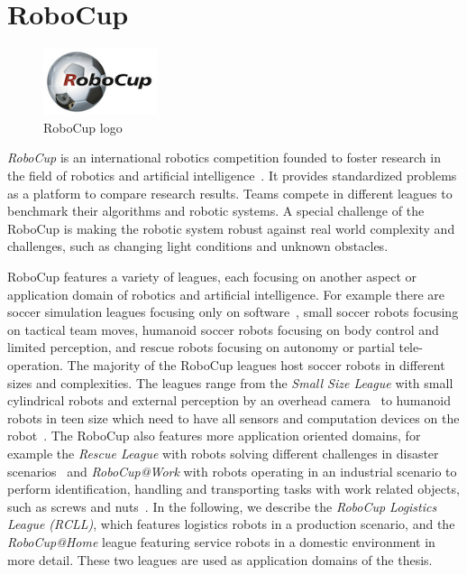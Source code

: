 \section{RoboCup}
\label{sec:robocup}
\begin{figure}
  \centering
  \vspace{-2.7ex}
  \includegraphics[width=0.3\textwidth]{img/robocup-logo}
  \vspace{-4ex}
  \caption[RoboCup logo]{RoboCup logo}
  \label{fig:rcll}
  \vspace{-2mm}
\end{figure}
\emph{RoboCup} is an international robotics competition founded to
foster research in the field of robotics and artificial
intelligence~\cite{RoboCup-Paper,Gazsim-Thesis}. It provides
standardized problems as a platform to compare research results. Teams
compete in different leagues to benchmark their algorithms and robotic
systems. A special challenge of the RoboCup is making the robotic
system robust against real world complexity and challenges, such as
changing light conditions and unknown obstacles.

RoboCup features a variety of leagues, each focusing on another aspect
or application domain of robotics and artificial intelligence.  For
example there are soccer simulation leagues focusing only on
software~\cite{simspark_old}, small soccer robots focusing on tactical
team moves, humanoid soccer robots focusing on body control and
limited perception, and rescue robots focusing on autonomy or partial
tele-operation. The majority of the RoboCup leagues host soccer robots
in different sizes and complexities. The leagues range from the
\emph{Small Size League} with small cylindrical robots and external
perception by an overhead camera~\cite{rc-ssl} to humanoid
robots in teen size which need to have all sensors and computation
devices on the robot~\cite{rc-book}. The RoboCup also features more
application oriented domains, for example the \emph{Rescue League} with
robots solving different challenges in disaster
scenarios~\cite{rc-rescue} and \emph{RoboCup@Work} with robots
operating in an industrial scenario to perform identification,
handling and transporting tasks with work related objects, such as
screws and nuts~\cite{rc-work}. In the following, we describe the
\emph{RoboCup Logistics League (RCLL)}, which features logistics
robots in a production scenario, and the \emph{RoboCup@Home} league
featuring service robots in a domestic environment in more
detail. These two leagues are used as application domains of the
thesis.

